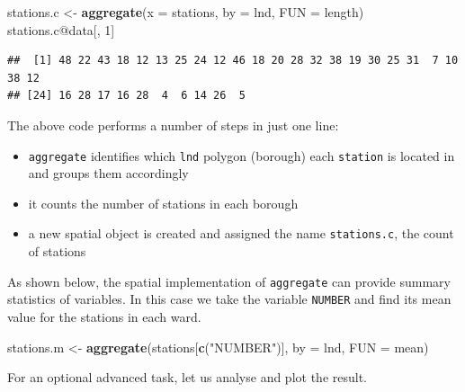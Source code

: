 \documentclass[]{article}
\newenvironment{Shaded}{}{}
\newcommand{\KeywordTok}[1]{\textcolor[rgb]{0.00,0.44,0.13}{\textbf{{#1}}}}
\newcommand{\DataTypeTok}[1]{\textcolor[rgb]{0.56,0.13,0.00}{{#1}}}
\newcommand{\DecValTok}[1]{\textcolor[rgb]{0.25,0.63,0.44}{{#1}}}
\newcommand{\StringTok}[1]{\textcolor[rgb]{0.25,0.44,0.63}{{#1}}}
\newcommand{\NormalTok}[1]{{#1}}
\begin{document}
\begin{Shaded}
\begin{Highlighting}[]
\NormalTok{stations.c <- }\KeywordTok{aggregate}\NormalTok{(}\DataTypeTok{x =} \NormalTok{stations, }\DataTypeTok{by =} \NormalTok{lnd, }\DataTypeTok{FUN =} \NormalTok{length)}
\NormalTok{stations.c@data[, }\DecValTok{1}\NormalTok{]}
\end{Highlighting}
\end{Shaded}
\begin{verbatim}
##  [1] 48 22 43 18 12 13 25 24 12 46 18 20 28 32 38 19 30 25 31  7 10 38 12
## [24] 16 28 17 16 28  4  6 14 26  5
\end{verbatim}
The above code performs a number of steps in just one line:

\begin{itemize}
\item
  \texttt{aggregate} identifies which \texttt{lnd} polygon (borough)
  each \texttt{station} is located in and groups them accordingly
\item
  it counts the number of stations in each borough
\item
  a new spatial object is created and assigned the name
  \texttt{stations.c}, the count of stations
\end{itemize}
As shown below, the spatial implementation of \texttt{aggregate} can
provide summary statistics of variables. In this case we take the
variable \texttt{NUMBER} and find its mean value for the stations in
each ward.

\begin{Shaded}
\begin{Highlighting}[]
\NormalTok{stations.m <- }\KeywordTok{aggregate}\NormalTok{(stations[}\KeywordTok{c}\NormalTok{(}\StringTok{"NUMBER"}\NormalTok{)], }\DataTypeTok{by =} \NormalTok{lnd, }\DataTypeTok{FUN =} \NormalTok{mean)}
\end{Highlighting}
\end{Shaded}
For an optional advanced task, let us analyse and plot the result.
\end{document}
